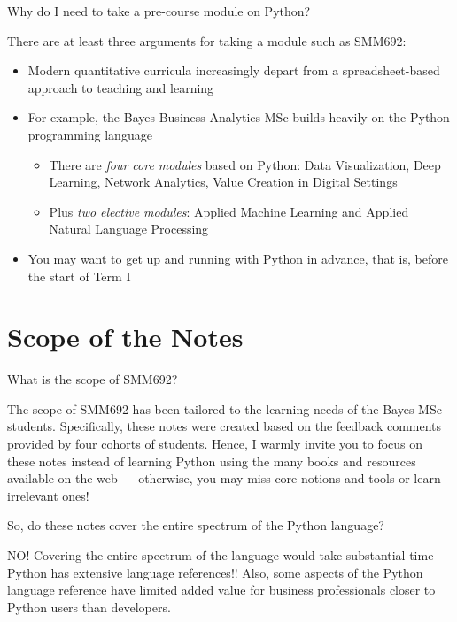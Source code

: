 \documentclass[a4paper,11pt]{book}
\newcommand{\question}[1]{%
    \begin{tcolorbox}[colback=comp_c!10,colframe=comp_c,sidebyside align=top,width=\linewidth,before skip=1ex]
        #1
    \end{tcolorbox}
    \switchcolumn%
}
\newcommand{\note}[1]{%
    \begin{tcolorbox}[colback=white!0,colframe=white!10,width=\linewidth,before skip=1ex]
        #1
    \end{tcolorbox}
}
\begin{document}
\begin{paracol}{2}
	\question{\raggedright Why do I need to take a pre-course module on Python?}
        \note{
	There are at least three arguments for taking a module such as SMM692:
	\begin{itemize}
		\item Modern quantitative curricula increasingly depart from a spreadsheet-based approach to teaching and learning
		\item For example, the Bayes Business Analytics MSc builds heavily on the Python programming language
		\begin{itemize}
			\item There are \emph{four core modules} based on Python: Data Visualization, Deep Learning, Network Analytics, Value Creation in Digital Settings
			\item Plus \emph{two elective modules}: Applied Machine Learning and Applied Natural Language Processing
		\end{itemize}
		\item You may want to get up and running with Python in advance, that is, before the start of Term I
	\end{itemize}
	}
\end{paracol}

\section{Scope of the Notes}

\begin{paracol}{2}
	\question{\raggedright What is the scope of SMM692?}
	\note{The scope of SMM692 has been tailored to the learning needs of the Bayes MSc students. Specifically, these notes were created based on the feedback comments provided by four cohorts of students. Hence, I warmly invite you to focus on these notes instead of learning Python using the many books and resources available on the web --- otherwise, you may miss core notions and tools or learn irrelevant ones!
	}
\end{paracol}
\clearpage

\begin{paracol}{2}
	\question{\raggedright So, do these notes cover the entire spectrum of the Python language?}	
	\note{NO! Covering the entire spectrum of the language would take substantial time --- Python has extensive language references!! Also, some aspects of the Python language reference have limited added value for business professionals closer to Python users than developers.
	}
\end{paracol}
\end{document}

